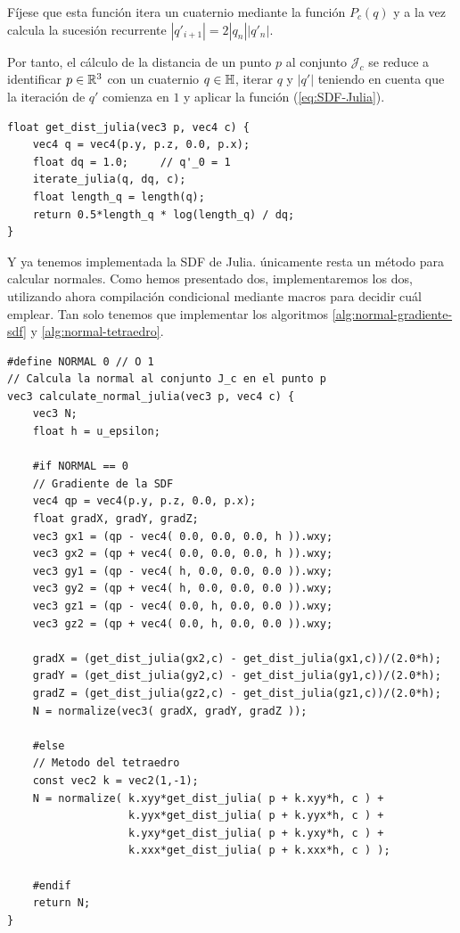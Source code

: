 Fíjese que esta función itera un cuaternio mediante la función $P_c(q)$ y a la vez calcula la sucesión recurrente $|q'_{i+1}|=2|q_n||q'_n|$. 

Por tanto, el cálculo de la distancia de un punto $p$ al conjunto $\mathcal{J}_c$ se reduce a identificar $p\in\mathbb{R}^3$ con un cuaternio $q\in\mathbb{H}$, iterar $q$ y $|q'|$ teniendo en cuenta que la iteración de $q'$ comienza en $1$ y aplicar la función (\ref{eq:SDF-Julia}).

\begin{lstlisting}
float get_dist_julia(vec3 p, vec4 c) { 
    vec4 q = vec4(p.y, p.z, 0.0, p.x);
    float dq = 1.0;     // q'_0 = 1
    iterate_julia(q, dq, c);
    float length_q = length(q);
    return 0.5*length_q * log(length_q) / dq;
}
\end{lstlisting}

Y ya tenemos implementada la SDF de Julia. únicamente resta un método para calcular normales. Como hemos presentado dos, implementaremos los dos, utilizando ahora compilación condicional mediante macros para decidir cuál emplear. Tan solo tenemos que implementar los algoritmos \ref{alg:normal-gradiente-sdf} y \ref{alg:normal-tetraedro}. %

\begin{lstlisting}
#define NORMAL 0 // O 1
// Calcula la normal al conjunto J_c en el punto p
vec3 calculate_normal_julia(vec3 p, vec4 c) {
    vec3 N;
    float h = u_epsilon;

    #if NORMAL == 0
    // Gradiente de la SDF
    vec4 qp = vec4(p.y, p.z, 0.0, p.x);
    float gradX, gradY, gradZ;
    vec3 gx1 = (qp - vec4( 0.0, 0.0, 0.0, h )).wxy;
    vec3 gx2 = (qp + vec4( 0.0, 0.0, 0.0, h )).wxy;
    vec3 gy1 = (qp - vec4( h, 0.0, 0.0, 0.0 )).wxy;
    vec3 gy2 = (qp + vec4( h, 0.0, 0.0, 0.0 )).wxy;
    vec3 gz1 = (qp - vec4( 0.0, h, 0.0, 0.0 )).wxy;
    vec3 gz2 = (qp + vec4( 0.0, h, 0.0, 0.0 )).wxy;
    
    gradX = (get_dist_julia(gx2,c) - get_dist_julia(gx1,c))/(2.0*h);
    gradY = (get_dist_julia(gy2,c) - get_dist_julia(gy1,c))/(2.0*h);
    gradZ = (get_dist_julia(gz2,c) - get_dist_julia(gz1,c))/(2.0*h);
    N = normalize(vec3( gradX, gradY, gradZ ));

    #else
    // Metodo del tetraedro
    const vec2 k = vec2(1,-1);
    N = normalize( k.xyy*get_dist_julia( p + k.xyy*h, c ) + 
                   k.yyx*get_dist_julia( p + k.yyx*h, c ) + 
                   k.yxy*get_dist_julia( p + k.yxy*h, c ) + 
                   k.xxx*get_dist_julia( p + k.xxx*h, c ) );

    #endif
    return N;
}
\end{lstlisting}

